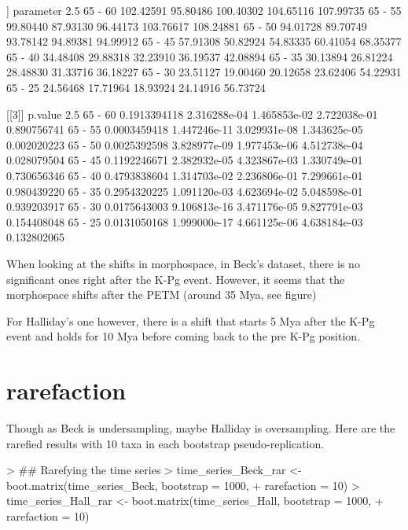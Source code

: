 \documentclass{article}
\begin{document}
\begin{Schunk}
\begin{Soutput}
[[2]]
        parameter     2.5%       25%       75%     97.5%
65 - 60 102.42591 95.80486 100.40302 104.65116 107.99735
65 - 55  99.80440 87.93130  96.44173 103.76617 108.24881
65 - 50  94.01728 89.70749  93.78142  94.89381  94.99912
65 - 45  57.91308 50.82924  54.83335  60.41054  68.35377
65 - 40  34.48408 29.88318  32.23910  36.19537  42.08894
65 - 35  30.13894 26.81224  28.48830  31.33716  36.18227
65 - 30  23.51127 19.00460  20.12658  23.62406  54.22931
65 - 25  24.56468 17.71964  18.93924  24.14916  56.73724

[[3]]
             p.value         2.5%          25%          75%       97.5%
65 - 60 0.1913394118 2.316288e-04 1.465853e-02 2.722038e-01 0.890756741
65 - 55 0.0003459418 1.447246e-11 3.029931e-08 1.343625e-05 0.002020223
65 - 50 0.0025392598 3.828977e-09 1.977453e-06 4.512738e-04 0.028079504
65 - 45 0.1192246671 2.382932e-05 4.323867e-03 1.330749e-01 0.730656346
65 - 40 0.4793838604 1.314703e-02 2.236806e-01 7.299661e-01 0.980439220
65 - 35 0.2954320225 1.091120e-03 4.623694e-02 5.048598e-01 0.939203917
65 - 30 0.0175643003 9.106813e-16 3.471176e-05 9.827791e-03 0.154408048
65 - 25 0.0131050168 1.999000e-17 4.661125e-06 4.638184e-03 0.132802065
\end{Soutput}
\end{Schunk}

When looking at the shifts in morphospace, in Beck's dataset, there is no significant ones right after the K-Pg event.
However, it seems that the morphospace shifts after the PETM (around 35 Mya, see figure)

For Halliday's one however, there is a shift that starts 5 Mya after the K-Pg event and holds for 10 Mya before coming back to the pre K-Pg position.


\section{rarefaction}

Though as Beck is undersampling, maybe Halliday is oversampling.
Here are the rarefied results with 10 taxa in each bootstrap pseudo-replication.

\begin{Schunk}
\begin{Sinput}
> ## Rarefying the time series
> time_series_Beck_rar <- boot.matrix(time_series_Beck, bootstrap = 1000,
+     rarefaction = 10)
> time_series_Hall_rar <- boot.matrix(time_series_Hall, bootstrap = 1000,
+     rarefaction = 10)
\end{Sinput}
\end{Schunk}
\end{document}
